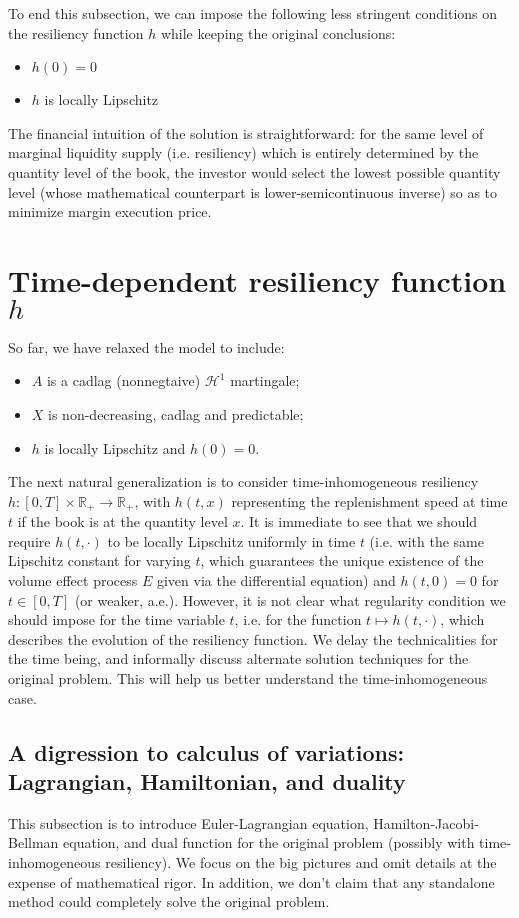 \documentclass[openany,oneside]{article}
\theoremstyle{definition}
\theoremstyle{remark}
\begin{document}
To end this subsection, we can impose the following less stringent conditions on the resiliency function $h$ while keeping the original conclusions:
\begin{itemize}
\item $h(0)=0$
\item $h$ is locally Lipschitz
\end{itemize}
The financial intuition of the solution is straightforward: for the same level of marginal liquidity supply (i.e. resiliency) which is entirely determined by the quantity level of the book, the investor would select the lowest possible quantity level (whose mathematical counterpart is lower-semicontinuous inverse) so as to minimize margin execution price.


\section{Time-dependent resiliency function $h$}
So far, we have relaxed the model to include:
\begin{itemize}
\item $A$ is a cadlag (nonnegtaive) $\mathcal{H}^1$ martingale;
\item $X$ is non-decreasing, cadlag and predictable;
\item $h$ is locally Lipschitz and $h(0)=0$.
\end{itemize}

The next natural generalization is to consider time-inhomogeneous resiliency $h:[0,T]\times \mathbb{R}_+ \to \mathbb{R}_+$, with $h(t,x)$ representing the replenishment speed at time $t$ if the book is at the quantity level $x$. It is immediate to see that we should require $h(t,\cdot)$ to be locally Lipschitz uniformly in time $t$ (i.e. with the same Lipschitz constant for varying $t$, which guarantees the unique existence of the volume effect process $E$ given via the differential equation) and $h(t,0)=0$ for $t\in[0,T]$ (or weaker, a.e.). However, it is not clear what regularity condition we should impose for the time variable $t$, i.e. for the function $t\mapsto h(t,\cdot)$, which describes the evolution of the resiliency function. We delay the technicalities for the time being, and informally discuss alternate solution techniques for the original problem. This will help us better understand the time-inhomogeneous case.

\subsection{A digression to calculus of variations: Lagrangian, Hamiltonian, and duality}
This subsection is to introduce Euler-Lagrangian equation, Hamilton-Jacobi-Bellman equation, and dual function for the original problem (possibly with time-inhomogeneous resiliency). We focus on the big pictures and omit details at the expense of mathematical rigor. In addition, we don't claim that any standalone method could completely solve the original problem.
\end{document}
